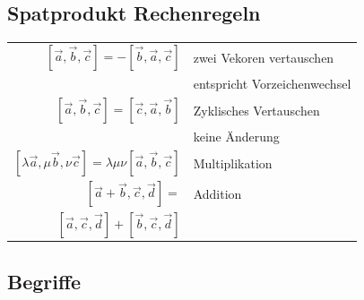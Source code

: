 \subsection{Spatprodukt Rechenregeln}

\begin{tabular}{r|l}
    $[\vec{a}, \vec{b}, \vec{c}] = -[\vec{b}, \vec{a}, \vec{c}]$ & zwei Vekoren vertauschen \\
                                                                 & entspricht Vorzeichenwechsel \\
    $[\vec{a}, \vec{b}, \vec{c}] = [\vec{c}, \vec{a}, \vec{b}] $ & Zyklisches Vertauschen \\
                                                                 & keine Änderung \\
    $[\lambda \vec{a}, \mu \vec{b}, \nu \vec{c}] = \lambda\mu\nu[\vec{a}, \vec{b}, \vec{c}]$ & Multiplikation \\
    $[\vec{a} + \vec{b}, \vec{c}, \vec{d}] = $ & Addition \\
    $[\vec{a}, \vec{c}, \vec{d}] + [\vec{b}, \vec{c}, \vec{d}]$ & \\
\end{tabular}

\subsection{Begriffe}

